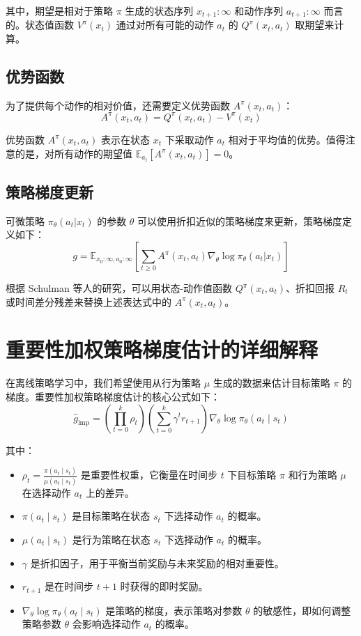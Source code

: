 \documentclass[twocolumn, 10pt]{article} %
\theoremstyle{remark}
\begin{document}
其中，期望是相对于策略 \( \pi \) 生成的状态序列 \( x_{t+1}:\infty \) 和动作序列 \( a_{t+1}:\infty \) 而言的。状态值函数 \( V^\pi(x_t) \) 通过对所有可能的动作 \( a_t \) 的 \( Q^\pi(x_t, a_t) \) 取期望来计算。

\subsection{优势函数}
为了提供每个动作的相对价值，还需要定义优势函数 \( A^\pi(x_t, a_t) \)：
\[
A^\pi(x_t, a_t) = Q^\pi(x_t, a_t) - V^\pi(x_t)
\]

优势函数 \( A^\pi(x_t, a_t) \) 表示在状态 \( x_t \) 下采取动作 \( a_t \) 相对于平均值的优势。值得注意的是，对所有动作的期望值 \( \mathbb{E}_{a_t} \left[A^\pi(x_t, a_t)\right] = 0 \)。

\subsection{策略梯度更新}

可微策略 \( \pi_\theta(a_t | x_t) \) 的参数 \( \theta \) 可以使用折扣近似的策略梯度来更新，策略梯度定义如下：
\[
g = \mathbb{E}_{x_0:\infty, a_0:\infty} \left[\sum_{t \geq 0} A^\pi(x_t, a_t) \nabla_\theta \log \pi_\theta(a_t | x_t)\right]
\]

根据 Schulman 等人的研究，可以用状态-动作值函数 \( Q^\pi(x_t, a_t) \)、折扣回报 \( R_t \) 或时间差分残差来替换上述表达式中的 \( A^\pi(x_t, a_t) \)。





\section{重要性加权策略梯度估计的详细解释}

在离线策略学习中，我们希望使用从行为策略 \( \mu \) 生成的数据来估计目标策略 \( \pi \) 的梯度。重要性加权策略梯度估计的核心公式如下：
\[
\hat{g}_{\text{imp}} = \left( \prod_{t=0}^{k} \rho_t \right) \left( \sum_{t=0}^{k} \gamma^t r_{t+1} \right) \nabla_\theta \log \pi_\theta(a_t \mid s_t)
\]

其中：

\begin{itemize}
    \item \( \rho_t = \frac{\pi(a_t \mid s_t)}{\mu(a_t \mid s_t)} \) 是重要性权重，它衡量在时间步 \( t \) 下目标策略 \( \pi \) 和行为策略 \( \mu \) 在选择动作 \( a_t \) 上的差异。
    \item \( \pi(a_t \mid s_t) \) 是目标策略在状态 \( s_t \) 下选择动作 \( a_t \) 的概率。
    \item \( \mu(a_t \mid s_t) \) 是行为策略在状态 \( s_t \) 下选择动作 \( a_t \) 的概率。
    \item \( \gamma \) 是折扣因子，用于平衡当前奖励与未来奖励的相对重要性。
    \item \( r_{t+1} \) 是在时间步 \( t+1 \) 时获得的即时奖励。
    \item \( \nabla_\theta \log \pi_\theta(a_t \mid s_t) \) 是策略的梯度，表示策略对参数 \( \theta \) 的敏感性，即如何调整策略参数 \( \theta \) 会影响选择动作 \( a_t \) 的概率。
\end{itemize}
\end{document}
